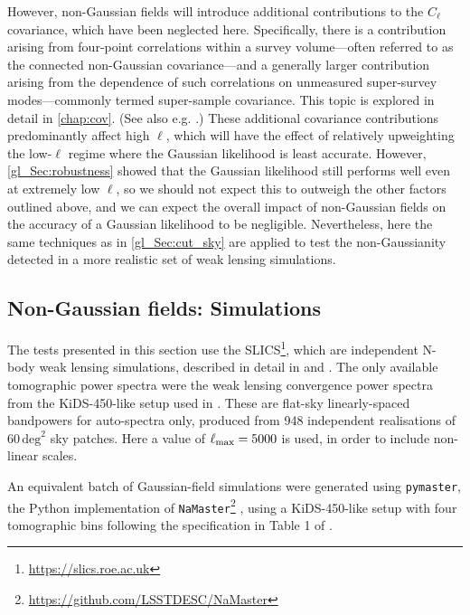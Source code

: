 However, non-Gaussian fields will introduce additional contributions to the $C_\ell$ covariance, which have been neglected here. Specifically, there is a contribution arising from
four-point correlations within a survey volume---often referred to as the connected non-Gaussian covariance---and a generally larger contribution arising from the dependence of such correlations on unmeasured super-survey modes---commonly termed super-sample covariance.
This topic is explored in detail in \autoref{chap:cov}. (See also e.g. \cite{Scoccimarro1999, Cooray2001, Takada2007, Takada2013, Li2014, Barreira2018ssc, Barreira2018b}.)
These additional covariance contributions predominantly affect high $\ell$, which will have the effect of relatively upweighting the low-$\ell$ regime where the Gaussian likelihood is least accurate. However, \autoref{gl_Sec:robustness} showed that the Gaussian likelihood still performs well even at extremely low $\ell$, so we should not expect this to outweigh the other factors outlined above, and
we can expect the overall impact of non-Gaussian fields on the accuracy of a Gaussian likelihood to be negligible. Nevertheless, here the same techniques as in \autoref{gl_Sec:cut_sky} are applied to test the non-Gaussianity detected in a more realistic set of weak lensing simulations.

\subsection{Non-Gaussian fields: Simulations}

The tests presented in this section use the SLICS\footnote{\url{https://slics.roe.ac.uk}}, which are independent N-body weak lensing simulations, described in detail in \citet{Harnois-Deraps2015} and \citet{Harnois-Deraps2018}.
The only available tomographic power spectra were the weak lensing convergence power spectra from the KiDS-450-like setup used in \citet{Hildebrandt2017}.
These are flat-sky linearly-spaced bandpowers for auto-spectra only, produced from 948 independent realisations of $60\,\text{deg}^2$ sky patches.
Here a value of $\ell_\text{max} = 5000$ is used, in order to include non-linear scales.

An equivalent batch of Gaussian-field simulations were generated using \texttt{pymaster}, the Python implementation of \texttt{NaMaster}\footnote{\url{https://github.com/LSSTDESC/NaMaster}} \citep{Alonso2019}, using a KiDS-450-like setup with four tomographic bins following the specification in Table 1 of \citet{Hildebrandt2017}.

